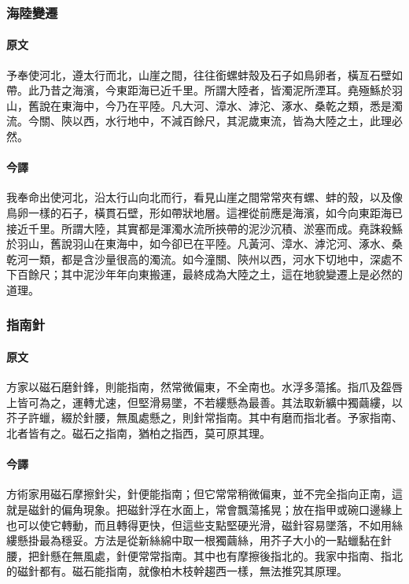 \documentclass[UTF8,zihao=-4]{ctexart}
\begin{document}
\subsubsection*{海陸變遷}

\paragraph{原文}
予奉使河北，遵太行而北，山崖之間，往往銜螺蚌殼及石子如鳥卵者，橫亙石壁如帶。此乃昔之海濱，今東距海已近千里。所謂大陸者，皆濁泥所湮耳。堯殛鯀於羽山，舊說在東海中，今乃在平陸。凡大河、漳水、滹沱、涿水、桑乾之類，悉是濁流。今關、陝以西，水行地中，不減百餘尺，其泥歲東流，皆為大陸之土，此理必然。

\paragraph{今譯}
我奉命出使河北，沿太行山向北而行，看見山崖之間常常夾有螺、蚌的殼，以及像鳥卵一樣的石子，橫貫石壁，形如帶狀地層。這裡從前應是海濱，如今向東距海已接近千里。所謂大陸，其實都是渾濁水流所挾帶的泥沙沉積、淤塞而成。堯誅殺鯀於羽山，舊說羽山在東海中，如今卻已在平陸。凡黃河、漳水、滹沱河、涿水、桑乾河一類，都是含沙量很高的濁流。如今潼關、陝州以西，河水下切地中，深處不下百餘尺；其中泥沙年年向東搬運，最終成為大陸之土，這在地貌變遷上是必然的道理。

\subsubsection*{指南針}

\paragraph{原文}
方家以磁石磨針鋒，則能指南，然常微偏東，不全南也。水浮多蕩搖。指爪及盌唇上皆可為之，運轉尤速，但堅滑易墜，不若縷懸為最善。其法取新纊中獨繭縷，以芥子許蠟，綴於針腰，無風處懸之，則針常指南。其中有磨而指北者。予家指南、北者皆有之。磁石之指南，猶柏之指西，莫可原其理。

\paragraph{今譯}
方術家用磁石摩擦針尖，針便能指南；但它常常稍微偏東，並不完全指向正南，這就是磁針的偏角現象。把磁針浮在水面上，常會飄蕩搖晃；放在指甲或碗口邊緣上也可以使它轉動，而且轉得更快，但這些支點堅硬光滑，磁針容易墜落，不如用絲縷懸掛最為穩妥。方法是從新絲綿中取一根獨繭絲，用芥子大小的一點蠟黏在針腰，把針懸在無風處，針便常常指南。其中也有摩擦後指北的。我家中指南、指北的磁針都有。磁石能指南，就像柏木枝幹趨西一樣，無法推究其原理。
\end{document}
